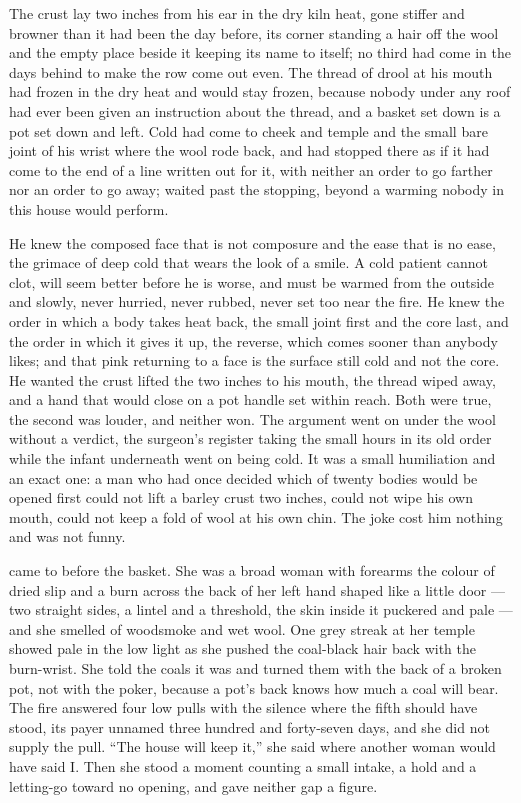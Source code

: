 The crust lay two inches from his ear in the dry kiln heat, gone stiffer and browner than it had been the day before, its corner standing a hair off the wool and the empty place beside it keeping its name to itself; no third had come in the days behind to make the row come out even. The thread of drool at his mouth had frozen in the dry heat and would stay frozen, because nobody under any roof had ever been given an instruction about the thread, and a basket set down is a pot set down and left. Cold had come to cheek and temple and the small bare joint of his wrist where the wool rode back, and had stopped there as if it had come to the end of a line written out for it, with neither an order to go farther nor an order to go away;  waited past the stopping, beyond a warming nobody in this house would perform.

He knew the composed face that is not composure and the ease that is no ease, the grimace of deep cold that wears the look of a smile. A cold patient cannot clot, will seem better before he is worse, and must be warmed from the outside and slowly, never hurried, never rubbed, never set too near the fire. He knew the order in which a body takes heat back, the small joint first and the core last, and the order in which it gives it up, the reverse, which comes sooner than anybody likes; and that pink returning to a face is the surface still cold and not the core. He wanted the crust lifted the two inches to his mouth, the thread wiped away, and a hand that would close on a pot handle set within reach. Both were true, the second was louder, and neither won. The argument went on under the wool without a verdict, the surgeon's register taking the small hours in its old order while the infant underneath went on being cold. It was a small humiliation and an exact one: a man who had once decided which of twenty bodies would be opened first could not lift a barley crust two inches, could not wipe his own mouth, could not keep a fold of wool at his own chin. The joke cost him nothing and was not funny.

\scenebreak

 came to  before the basket. She was a broad woman with forearms the colour of dried slip and a burn across the back of her left hand shaped like a little door --- two straight sides, a lintel and a threshold, the skin inside it puckered and pale --- and she smelled of woodsmoke and wet wool. One grey streak at her temple showed pale in the low light as she pushed the coal-black hair back with the burn-wrist. She told the coals it was  and turned them with the back of a broken pot, not with the poker, because a pot's back knows how much a coal will bear. The fire answered four low pulls with the silence where the fifth should have stood, its payer unnamed three hundred and forty-seven days, and she did not supply the pull. “The house will keep it,” she said where another woman would have said I. Then she stood a moment counting a small intake, a hold and a letting-go toward no opening, and gave neither gap a figure.

